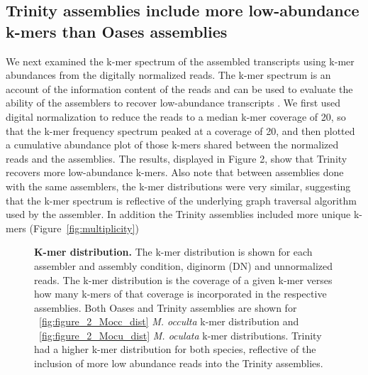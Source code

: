 \subsection{Trinity assemblies include more low-abundance k-mers than Oases assemblies}
We next examined the k-mer spectrum of the assembled transcripts using k-mer abundances from the digitally normalized reads. The k-mer spectrum is an account of the information content of the reads and can be used to evaluate the ability of the assemblers to recover low-abundance transcripts \citep{pop_genome_2009}.  We first used digital normalization to reduce the reads to a median k-mer coverage of 20, so that the k-mer frequency spectrum peaked at a coverage of 20, and then plotted a cumulative abundance plot of those k-mers shared between the normalized reads and the assemblies. The results, displayed in Figure 2, show that Trinity recovers more low-abundance k-mers.  Also note that between assemblies done with the same assemblers, the k-mer distributions were very similar, suggesting that the k-mer spectrum is reflective of the underlying graph traversal algorithm used by the assembler. In addition the Trinity assemblies included more unique k-mers (Figure~\ref{fig:multiplicity})

\begin{figure}[!ht]
	\hfill
	\caption{\textbf{K-mer distribution.} The k-mer distribution is shown for each assembler and assembly condition, diginorm (DN) and unnormalized reads. The k-mer distribution is the coverage of a given k-mer verses how many k-mers of that coverage is incorporated in the respective assemblies. Both Oases and Trinity assemblies are shown for ~\ref{fig:figure_2_Mocc_dist} \textit{M. occulta} k-mer distribution and  ~\ref{fig:figure_2_Mocu_dist} \textit{M. oculata} k-mer distributions. Trinity had a higher k-mer distribution for both species, reflective of the inclusion of more low abundance reads into the Trinity assemblies.}
	\label{fig:k-mer_spec}
\end{figure}

